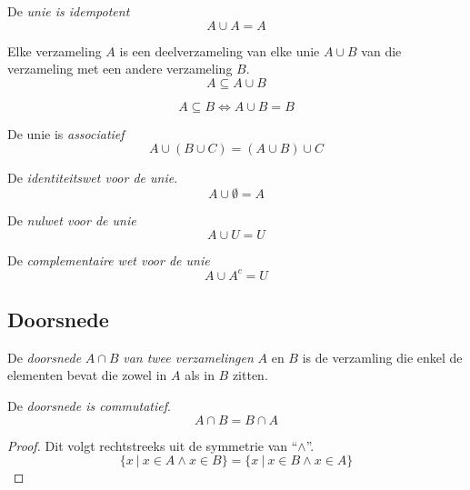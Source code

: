 \documentclass[main.tex]{subfiles}
\begin{document}
\begin{ei}
  De \emph{unie is idempotent}
  \[ A \cup A = A \]
\end{ei}

\begin{st}
  Elke verzameling $A$ is een deelverzameling van elke unie $A \cup B$ van die verzameling met een andere verzameling $B$.
  \[ A \subseteq A \cup B \]
\end{st}

\begin{st}
  \[ A \subseteq B \Leftrightarrow A \cup B = B \]
\end{st}

\begin{st}
  De unie is \emph{associatief}
  \[ A \cup (B \cup C) = (A \cup B) \cup C \]
\end{st}

\begin{st}
  De \emph{identiteitswet voor de unie}.
  \[ A \cup \emptyset = A \]
\end{st}

\begin{st}
  De \emph{nulwet voor de unie}
  \[ A \cup U = U \]
\end{st}

\begin{st}
  De \emph{complementaire wet voor de unie}
  \[ A \cup A^{c} = U \]
\end{st}

\subsection{Doorsnede}
\label{sec:doorsnede}

\begin{de}
  De \emph{doorsnede} $A \cap B$ \emph{van twee verzamelingen} $A$ en $B$ is de verzamling die enkel de elementen bevat die zowel in $A$ als in $B$ zitten.
\end{de}

\begin{ei}
  De \emph{doorsnede is commutatief}.
  \[ A \cap B = B \cap A \]
  \begin{proof}
    Dit volgt rechtstreeks uit de symmetrie van ``$\wedge$''.
    \[ \{ x\ |\ x \in A \wedge x \in B\} = \{ x\ |\ x \in B \wedge x \in A\} \]
  \end{proof}
\end{ei}
\end{document}
